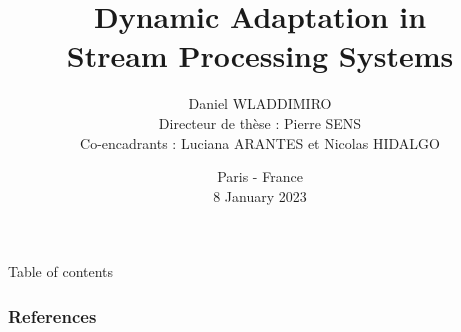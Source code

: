 \documentclass[compress,xcolor=table]{beamer}
\title{\LARGE Dynamic Adaptation in \\Stream Processing Systems}
\date{Paris - France\\8 January 2023}
\author{Daniel WLADDIMIRO\\
{\footnotesize Directeur de thèse : Pierre SENS\\
Co-encadrants : Luciana ARANTES et Nicolas HIDALGO}}
\institute{LIP6 - Sorbonne Université, CNRS}
\begin{document}
\begin{frame}[plain]
	\titlepage
	\setcounter{framenumber}{0}
\end{frame}

\begin{frame}{Table of contents}
\tableofcontents
\end{frame}











\appendix

\begin{frame}[allowframebreaks]
\frametitle{References}
\printbibliography
\end{frame}
\end{document}
